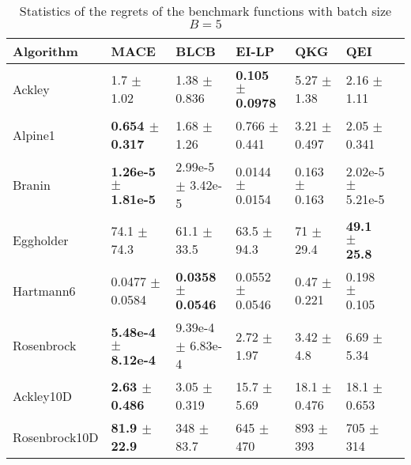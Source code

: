 \begin{table*}[!htb]
    \centering
    \caption{Statistics of the regrets of the benchmark functions with batch size $B=5$}
    \label{tab:result_analytical_b5}
    \begin{tabular}{lllllll}
        \toprule
        Algorithm     & MACE                       & BLCB                        & EI-LP                   & QKG                   & QEI                         \\ 
        \midrule
        Ackley        & 1.7             $\pm$  1.02     &  1.38           $\pm$  0.836   &  \textbf{0.105 $\pm$  0.0978} &  5.27  $\pm$  1.38   &  2.16         $\pm$  1.11      \\
        Alpine1       & \textbf{0.654   $\pm$  0.317}   &  1.68           $\pm$  1.26    &  0.766         $\pm$  0.441   &  3.21  $\pm$  0.497  &  2.05         $\pm$  0.341     \\
        Branin        & \textbf{1.26e-5 $\pm$  1.81e-5} &  2.99e-5        $\pm$  3.42e-5 &  0.0144        $\pm$  0.0154  &  0.163 $\pm$  0.163  &  2.02e-5      $\pm$  5.21e-5   \\
        Eggholder     & 74.1            $\pm$  74.3     &  61.1           $\pm$  33.5    &  63.5          $\pm$  94.3    &  71    $\pm$  29.4   &  \textbf{49.1 $\pm$  25.8}      \\
        Hartmann6     & 0.0477          $\pm$  0.0584   &  \textbf{0.0358 $\pm$  0.0546} &  0.0552        $\pm$  0.0546  &  0.47  $\pm$  0.221  &  0.198        $\pm$  0.105     \\
        Rosenbrock    & \textbf{5.48e-4 $\pm$  8.12e-4} &  9.39e-4        $\pm$  6.83e-4 &  2.72          $\pm$  1.97    &  3.42  $\pm$  4.8    &  6.69         $\pm$  5.34      \\
        Ackley10D     & \textbf{2.63    $\pm$  0.486}   &  3.05           $\pm$  0.319   &  15.7          $\pm$  5.69    &  18.1  $\pm$  0.476  &  18.1         $\pm$  0.653     \\
        Rosenbrock10D & \textbf{81.9    $\pm$  22.9}    &  348            $\pm$  83.7    &  645           $\pm$  470     &  893   $\pm$  393    &  705          $\pm$  314       \\
        \bottomrule
    \end{tabular}
\end{table*}
